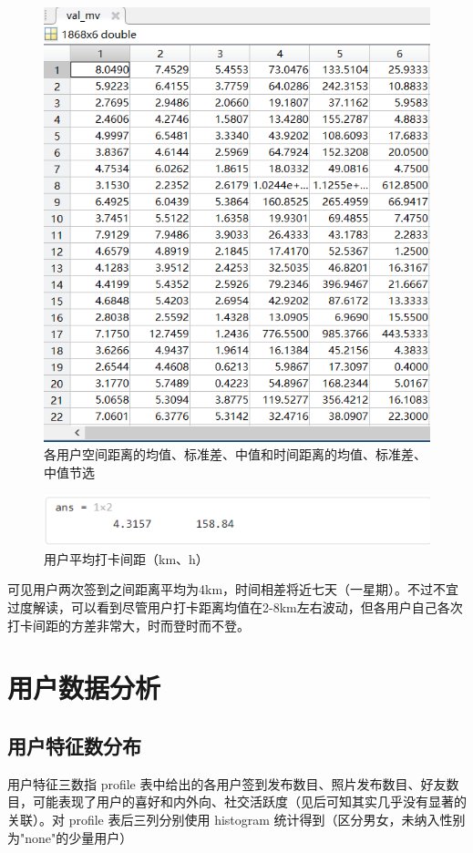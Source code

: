 \documentclass[UTF8]{ctexart}
\begin{document}
		\begin{figure}[H]
			\centering
			\includegraphics[scale=0.4]{val_mv.png}
			\caption{各用户空间距离的均值、标准差、中值和时间距离的均值、标准差、中值节选}
			\label{val_mv}
		\end{figure}
		\begin{figure}[H]
			\centering
			\includegraphics{val_mean.png}
			\caption{用户平均打卡间距（km、h）}
			\label{val_mean}
		\end{figure}
	
		可见用户两次签到之间距离平均为4km，时间相差将近七天（一星期）。不过不宜过度解读，可以看到尽管用户打卡距离均值在2-8km左右波动，但各用户自己各次打卡间距的方差非常大，时而登时而不登。
	
	\section{用户数据分析}
		\subsection{用户特征数分布}
		用户特征三数指 profile 表中给出的各用户签到发布数目、照片发布数目、好友数目，可能表现了用户的喜好和内外向、社交活跃度（见后可知其实几乎没有显著的关联）。对 profile 表后三列分别使用 histogram 统计得到（区分男女，未纳入性别为"none"的少量用户）
		
\end{document}
